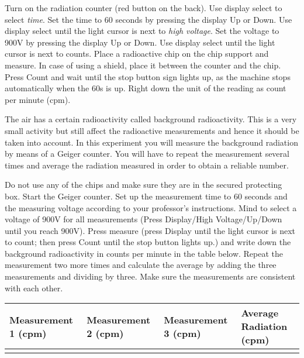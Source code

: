 \documentclass[main.tex]{subfiles}
\begin{document}
\vspace{0.2cm}{\large \bfseries 0. Instructions for the use of ST360 radiation counter}
\begin{steps}
    \newstep[] Turn on the radiation counter (red button on the back).
        \newstep[]  Use display select to select \emph{time}. Set the time to 60 seconds by pressing the display Up or Down.
            \newstep[]  Use display select until the light cursor is next to \emph{high voltage}. Set the voltage to 900V  by pressing the display Up or Down.
                \newstep[]  Use display select until the light cursor is next to counts.
                \newstep[]  Place a radioactive chip on the chip support and measure. In case of using a shield, place it between the counter and the chip.
                \newstep[]  Press Count and wait until the stop button sign lights up, as the machine stops automatically when the 60s is up. 
                \newstep[]  Right down the unit of the reading as count per minute (cpm). 
    \end{steps}



\vspace{0.2cm}{\large \bfseries 1. Background radiation}
The air has a certain radioactivity called background radioactivity. This is a very small activity but still affect the radioactive measurements and hence it should be taken into account. In this experiment you will measure the background radiation by means of a Geiger counter. You will have to repeat the measurement several times and average the radiation measured in order to obtain a reliable number.
\begin{steps}
 \newstep[] Do not use any of the chips and make sure they are in the secured protecting box.
    \newstep[] Start the Geiger counter. Set up the measurement time to 60 seconds and the measuring voltage according to your professor's instructions. Mind to select a voltage of 900V for all measurements (Press Display/High Voltage/Up/Down until you reach 900V). Press measure (press Display until the light cursor is next to count; then press Count until the stop button lights up.) and write down the background radioactivity in counts per minute in the table below.
  \newstep[] Repeat the measurement two more times and calculate the average by adding the three measurements and dividing by three. Make sure the measurements are consistent with each other.
\end{steps}

\begin{center}\resizebox{18cm}{!} {\begin{tabular}{ |p{4cm}|p{4cm}|p{4cm}|p{4cm}|  }
\hline
    Measurement 1 (cpm) &   Measurement  2 (cpm) &   Measurement  3 (cpm) &    Average Radiation (cpm)        \\
\hline
   \vspace{0cm}\vspace{.5cm} &     &     &       \\
\hline
\end{tabular}}\end{center}
\end{document}
